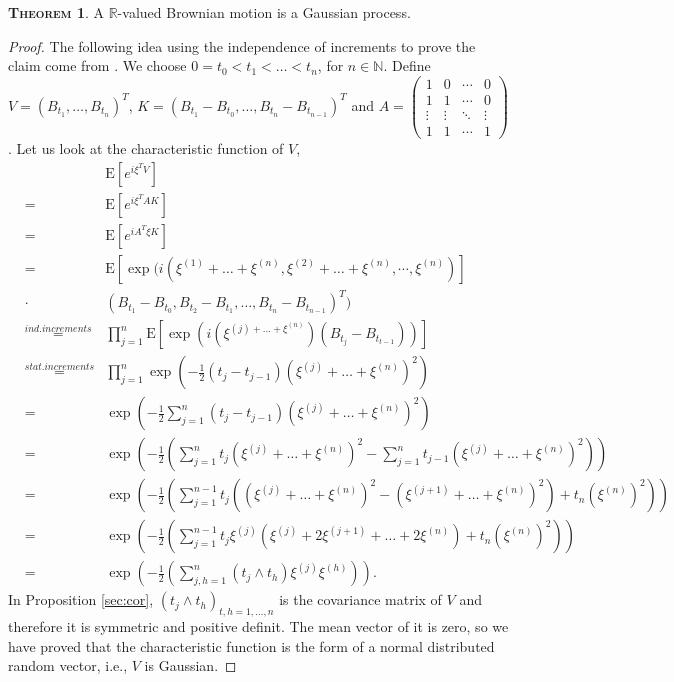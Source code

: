 \documentclass[a4paper, twoside, 11pt]{article}
\theoremstyle{definition}
\newtheorem{theorem}[definition]{\scshape Theorem}
\begin{document}
  \begin{theorem}
	A $\mathbb{R}$-valued Brownian motion is a Gaussian process.
  \end{theorem}
  \begin{proof}
	The following idea using the independence of increments to prove the claim come from \cite{shilling}.
	We choose $0=t_0<t_1<\dots<t_n$, for $n \in \mathbb{N}$. Define
	$V = (B_{t_1},\dots,B_{t_n})^T$,  $K = (B_{t_1}-B_{t_0},\dots, B_{t_n}-B_{t_{n-1}})^T$ and 
	$A = 
	\begin{pmatrix}
	  1      & 0      & \cdots & 0\\
	  1      & 1      & \cdots & 0\\
	  \vdots & \vdots & \ddots & \vdots \\
	  1      & 1      & \cdots & 1
	\end{pmatrix}
	  $.
	Let us look at the characteristic function of $V$,
	\begin{eqnarray*}
	  &&\mathrm{E} [e^{i\xi^T V}]\\
	  &=& \mathrm{E} [e^{i\xi^T AK}]\\ 
	  &=& \mathrm{E} [e^{iA^T\xi K}]\\
	  &=& \mathrm{E} [\exp(i (\xi^{(1)}+\dots+\xi^{(n)}, \xi^{(2)}+\dots+\xi^{(n)}, \cdots,\xi^{(n)})] \\
	  &\cdot& (B_{t_1}-B_{t_0}, B_{t_2}-B_{t_1},\dots,B_{t_n}-B_{t_{n-1}})^T)\\
	  &\overset{ind.increments}{=}& \prod_{j=1}^n \mathrm{E} [\exp(i(\xi^{(j)+\dots+\xi^{(n)}})(B_{t_j}-B_{t_{t-1}}))]\\
	  &\overset{stat.increments}{=}& \prod_{j=1}^n \exp(-\frac{1}{2}(t_j - t_{j-1})(\xi^{(j)}+\dots+\xi^{(n)})^2) \\
	  &=& \exp\left(-\frac{1}{2}\sum_{j=1}^n (t_j - t_{j-1})(\xi^{(j)}+\dots+\xi^{(n)})^2\right)\\
	  &=& \exp\left(-\frac{1}{2}\left(\sum_{j=1}^n t_j(\xi^{(j)}+\dots+\xi^{(n)})^2 - \sum_{j=1}^n t_{j-1}(\xi^{(j)}+\dots+\xi^{(n)})^2\right)\right)\\
	  &=& \exp\left(-\frac{1}{2}\left(\sum_{j=1}^{n-1} t_j((\xi^{(j)}+\dots+\xi^{(n)})^2 - (\xi^{(j+1)}+\dots+\xi^{(n)})^2) + t_n(\xi^{(n)})^2\right)\right)\\
	  &=& \exp\left(-\frac{1}{2}\left(\sum_{j=1}^{n-1} t_j\xi^{(j)}(\xi^{(j)}+2\xi^{(j+1)}+\dots+2\xi^{(n)}) + t_n(\xi^{(n)})^2\right)\right)\\
	  &=& \exp\left(-\frac{1}{2}\left(\sum_{j,h=1}^n(t_j\wedge t_h)\xi^{(j)}\xi^{(h)}\right)\right).
	\end{eqnarray*}
	In Proposition \ref{sec:cor}, $(t_j\wedge t_h)_{t,h=1,\dots,n}$ is the covariance matrix of $V$ and therefore it is symmetric and positive definit. The mean vector of it is zero, so we have proved that the characteristic function is the form of a normal distributed random vector, i.e., $V$ is Gaussian.
  \end{proof}
\end{document}
